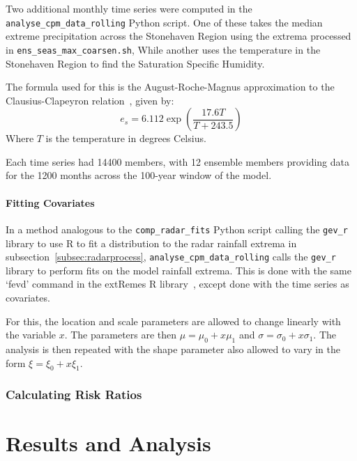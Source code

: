 \documentclass[12pt,a4paper]{report}
\begin{document}
Two additional monthly time series were computed in the \texttt{analyse\_cpm\_data\_rolling} Python script.
One of these takes the median extreme precipitation across the Stonehaven Region
    using the extrema processed in \texttt{ens\_seas\_max\_coarsen.sh},
While another uses the temperature in the Stonehaven Region to find the Saturation Specific Humidity.

The formula used for this is the August-Roche-Magnus approximation to the Clausius-Clapeyron relation~\cite{Alduchov_Eskridge_1996}, given by:
\begin{equation}\label{eq:qsat}
    e_s = 6.112 \exp\left( \frac{17.6 T}{T + 243.5} \right)
\end{equation}
Where $T$ is the temperature in degrees Celsius.

Each time series had 14400 members,
    with 12 ensemble members providing data for the 1200 months across the 100-year window of the model.

\subsubsection{Fitting Covariates}

In a method analogous to the \texttt{comp\_radar\_fits} Python script calling the \texttt{gev\_r} library to use R to fit
    a distribution to the radar rainfall extrema in subsection~\ref{subsec:radarprocess},
    \texttt{analyse\_cpm\_data\_rolling} calls the \texttt{gev\_r} library to perform fits on the model rainfall extrema.
This is done with the same `fevd' command in the extRemes R library~\cite{extremes_R},
    except done with the time series as covariates.

For this,
    the location and scale parameters are allowed to change linearly with the variable $x$.
The parameters are then $\mu = \mu_0 + x\mu_1$ and $\sigma = \sigma_0 + x\sigma_1$.
The analysis is then repeated with the shape parameter also allowed to vary in the form $\xi = \xi_0 + x\xi_1$.

\subsection{Calculating Risk Ratios}\label{subsec:riskratios}

\chapter{Results and Analysis}\label{ch:results}
\end{document}
